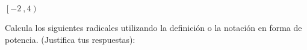 \documentclass[addpoints,spanish, 12pt,a4paper]{exam}
\begin{document}
\begin{questions}
\begin{solution}
$\left[-2 \ , 4\right)$ 
\end{solution}

\question Calcula los siguientes radicales utilizando la definición o la notación en forma de potencia. (Justifica tus respuestas):

\addpoints


\end{questions}
\end{document}

